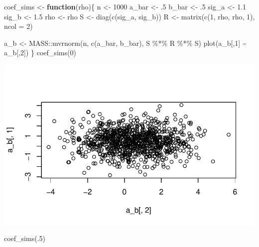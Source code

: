 \documentclass[
  letterpaper,
  DIV=11,
  numbers=noendperiod]{scrartcl}
\newenvironment{Shaded}{\begin{snugshade}}{\end{snugshade}}
\newcommand{\AttributeTok}[1]{\textcolor[rgb]{0.40,0.45,0.13}{#1}}
\newcommand{\ControlFlowTok}[1]{\textcolor[rgb]{0.00,0.23,0.31}{\textbf{#1}}}
\newcommand{\DecValTok}[1]{\textcolor[rgb]{0.68,0.00,0.00}{#1}}
\newcommand{\FloatTok}[1]{\textcolor[rgb]{0.68,0.00,0.00}{#1}}
\newcommand{\FunctionTok}[1]{\textcolor[rgb]{0.28,0.35,0.67}{#1}}
\newcommand{\NormalTok}[1]{\textcolor[rgb]{0.00,0.23,0.31}{#1}}
\newcommand{\OtherTok}[1]{\textcolor[rgb]{0.00,0.23,0.31}{#1}}
\newcommand{\SpecialCharTok}[1]{\textcolor[rgb]{0.37,0.37,0.37}{#1}}
\begin{document}
\begin{Shaded}
\begin{Highlighting}[]
\NormalTok{coef\_sims }\OtherTok{\textless{}{-}} \ControlFlowTok{function}\NormalTok{(rho)\{}
\NormalTok{  n }\OtherTok{\textless{}{-}} \DecValTok{1000}
\NormalTok{  a\_bar }\OtherTok{\textless{}{-}}\NormalTok{ .}\DecValTok{5}
\NormalTok{  b\_bar }\OtherTok{\textless{}{-}}\NormalTok{ .}\DecValTok{5}
\NormalTok{  sig\_a }\OtherTok{\textless{}{-}} \FloatTok{1.1}
\NormalTok{  sig\_b }\OtherTok{\textless{}{-}} \FloatTok{1.5}
\NormalTok{  rho }\OtherTok{\textless{}{-}}\NormalTok{ rho}
\NormalTok{  S }\OtherTok{\textless{}{-}} \FunctionTok{diag}\NormalTok{(}\FunctionTok{c}\NormalTok{(sig\_a, sig\_b))}
\NormalTok{  R }\OtherTok{\textless{}{-}} \FunctionTok{matrix}\NormalTok{(}\FunctionTok{c}\NormalTok{(}\DecValTok{1}\NormalTok{, rho, rho, }\DecValTok{1}\NormalTok{), }\AttributeTok{ncol =} \DecValTok{2}\NormalTok{)}
  
\NormalTok{  a\_b }\OtherTok{\textless{}{-}}\NormalTok{ MASS}\SpecialCharTok{::}\FunctionTok{mvrnorm}\NormalTok{(n, }\FunctionTok{c}\NormalTok{(a\_bar, b\_bar), S }\SpecialCharTok{\%*\%}\NormalTok{ R }\SpecialCharTok{\%*\%}\NormalTok{ S)}
  \FunctionTok{plot}\NormalTok{(a\_b[,}\DecValTok{1}\NormalTok{] }\SpecialCharTok{\textasciitilde{}}\NormalTok{ a\_b[,}\DecValTok{2}\NormalTok{])}
\NormalTok{\}}
\FunctionTok{coef\_sims}\NormalTok{(}\DecValTok{0}\NormalTok{)}
\end{Highlighting}
\end{Shaded}

\includegraphics{varying_intercepts_varying_slopes_files/figure-pdf/unnamed-chunk-3-1.pdf}

\begin{Shaded}
\begin{Highlighting}[]
\FunctionTok{coef\_sims}\NormalTok{(.}\DecValTok{5}\NormalTok{)}
\end{Highlighting}
\end{Shaded}
\end{document}

